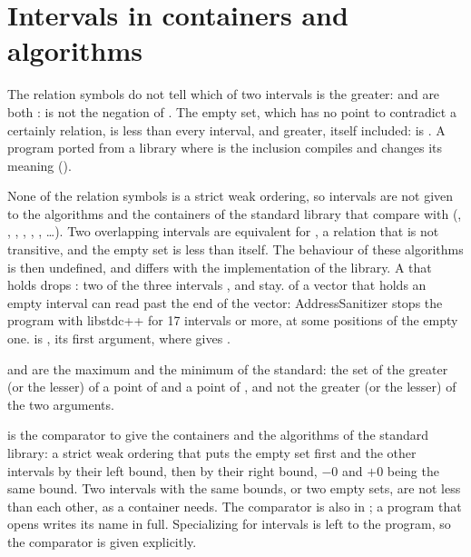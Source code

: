 \section{Intervals in containers and algorithms}\label{sec:lexicographic-less}
%
%
%

The relation symbols do not tell which of two intervals is the greater:
 and 
are both :  is not the negation of . The empty set,
which has no point to contradict a certainly relation, is less than every
interval, and greater, itself included:  is . A
program ported from a library where  is the inclusion compiles
and changes its meaning ().

\begin{Rem}\label{rem:relations-ordering}
None of the relation symbols is a strict weak ordering, so intervals are not
given to the algorithms and the containers of the standard library that
compare with \code{<} (, , ,
, , ,
\ldots). Two overlapping intervals are equivalent for
\code{<}, a relation that is not transitive, and the empty set is less than
itself. The behaviour of these algorithms is then undefined, and differs with
the implementation of the library. A  that holds
 drops : two of the three intervals ,
 and  stay.  of a vector that holds an
empty interval can read past the end of the vector: AddressSanitizer stops
the program with libstdc++ for 17 intervals or more, at some positions of
the empty one.  is , its
first argument, where  gives .
\end{Rem}

\medskip
{} and  are the maximum and the
minimum of the standard: the set of the greater (or the lesser) of a point of
 and a point of , and not the greater (or the lesser) of the
two arguments.

\medskip
{} is the comparator to give the containers
and the algorithms of the standard library: a strict weak ordering that puts
the empty set first and the other intervals by their left bound, then by
their right bound, $-0$ and $+0$ being the same bound.\newinvfive{} Two
intervals with the same bounds, or two empty sets, are not less than each
other, as a container needs. The comparator is also in ; a
program that opens  writes its name in full.
Specializing  for intervals is left to the program, so the
comparator is given explicitly.

